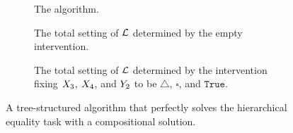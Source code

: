 \documentclass[twoside,11pt]{article}
\begin{document}
\begin{figure}[tp]
    \centering
    \begin{minipage}{0.48\textwidth}
\begin{subfigure}{\textwidth}
    \centering
    
    \caption{The algorithm.}
    \label{fig:low}
\end{subfigure}
\end{minipage}
\hfill
    \begin{minipage}{0.48\textwidth}
\begin{subfigure}{\textwidth}
    \centering
    
    \caption{The total setting of $\mathcal{L}$ determined by the empty intervention.}
    \label{fig:lownointervention}
\end{subfigure}

\begin{subfigure}{\textwidth}
    \centering
    
    \caption{The total setting of $\mathcal{L}$ determined by the intervention fixing $X_3$, $X_4$, and $Y_2$ to be $\bigtriangleup$, $\square$, and $\texttt{True}$.}
    \label{fig:lowintervention}
\end{subfigure}
\end{minipage}
\caption{A tree-structured algorithm that perfectly solves the hierarchical equality task with a compositional solution.}
\end{figure}
\end{document}

